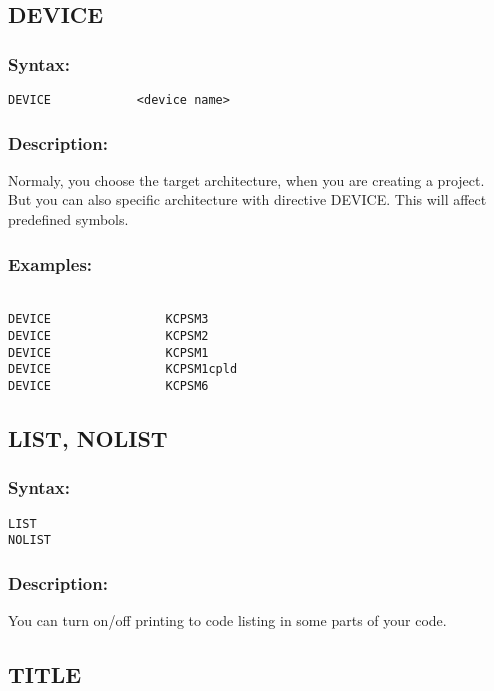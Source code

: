 {    \subsection{DEVICE}
        \subsubsection{Syntax:}
        \verb'DEVICE            <device name>'

        \subsubsection{Description:}
        Normaly, you choose the target architecture, when you are creating a project. But you can also specific architecture with directive DEVICE.
        This will affect predefined symbols.

        \subsubsection{Examples:}
        {
            ~\\
            \usecodefont       
            \verb'DEVICE                KCPSM3'\\
            \verb'DEVICE                KCPSM2'\\
            \verb'DEVICE                KCPSM1'\\
            \verb'DEVICE                KCPSM1cpld'\\
            \verb'DEVICE                KCPSM6'\\
        }

    \subsection{LIST, NOLIST}
        \subsubsection{Syntax:}
            \verb'LIST'\\
            \verb'NOLIST'

        \subsubsection{Description:}
        You can turn on/off printing to code listing in some parts of your code.

    \subsection{TITLE}
}
